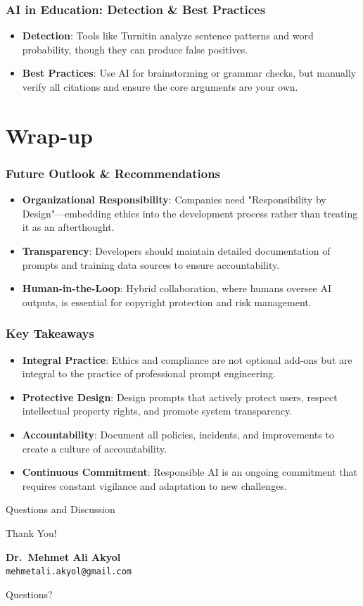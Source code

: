 \documentclass{beamer}
\begin{document}
\begin{frame}
    \frametitle{AI in Education: Detection \& Best Practices}
    \begin{itemize}
        \item \textbf{Detection}: Tools like Turnitin analyze sentence patterns and word probability, though they can produce false positives.
        \item \textbf{Best Practices}: Use AI for brainstorming or grammar checks, but manually verify all citations and ensure the core arguments are your own.
    \end{itemize}
\end{frame}

\section{Wrap-up}

\begin{frame}
    \frametitle{Future Outlook \& Recommendations}
    \begin{itemize}
        \item \textbf{Organizational Responsibility}: Companies need "Responsibility by Design"—embedding ethics into the development process rather than treating it as an afterthought.
        \item \textbf{Transparency}: Developers should maintain detailed documentation of prompts and training data sources to ensure accountability.
        \item \textbf{Human-in-the-Loop}: Hybrid collaboration, where humans oversee AI outputs, is essential for copyright protection and risk management.
    \end{itemize}
\end{frame}

\begin{frame}
    \frametitle{Key Takeaways}
    \begin{itemize}
        \item \textbf{Integral Practice}: Ethics and compliance are not optional add-ons but are integral to the practice of professional prompt engineering.
        \item \textbf{Protective Design}: Design prompts that actively protect users, respect intellectual property rights, and promote system transparency.
        \item \textbf{Accountability}: Document all policies, incidents, and improvements to create a culture of accountability.
        \item \textbf{Continuous Commitment}: Responsible AI is an ongoing commitment that requires constant vigilance and adaptation to new challenges.
    \end{itemize}
\end{frame}

\begin{frame}{Questions and Discussion}
    \begin{center}
    {\Huge Thank You!}
    \vspace{1cm}

        \textbf{Dr.\ Mehmet Ali Akyol}\\
        \texttt{mehmetali.akyol@gmail.com}
    \vspace{1cm}

    {\large Questions?}
    \end{center}
\end{frame}
\end{document}
